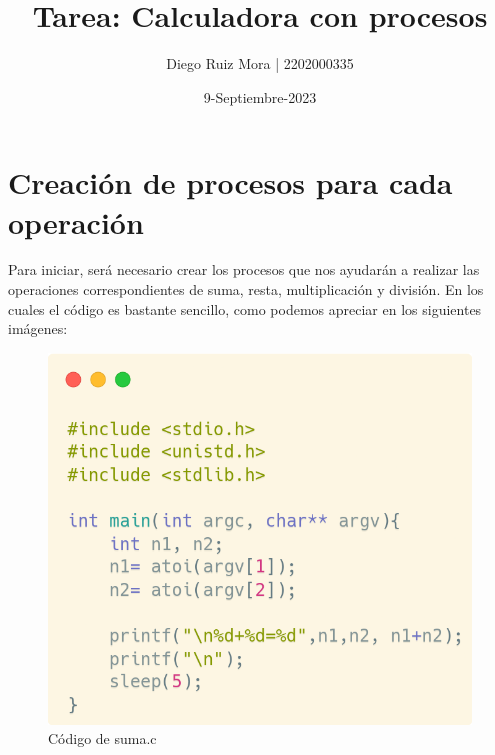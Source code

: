 \documentclass[11pt]{article}
\title{\textbf{Tarea: Calculadora con procesos}}
\author{Diego Ruiz Mora | 2202000335}
\date{9-Septiembre-2023}
\begin{document}
		
	\maketitle
	\section{Creación de procesos para cada operación}
	Para iniciar, será necesario crear los procesos que nos ayudarán a realizar las operaciones correspondientes de suma, resta, multiplicación y división. En los cuales el código es bastante sencillo, como podemos apreciar en los siguientes imágenes:
	
	\begin{figure}[h!]
		\centering
		\includegraphics[width=0.5\linewidth]{suma.png}
		\caption{Código de suma.c}
		\label{fig:suma}
	\end{figure}
	
\end{document}
